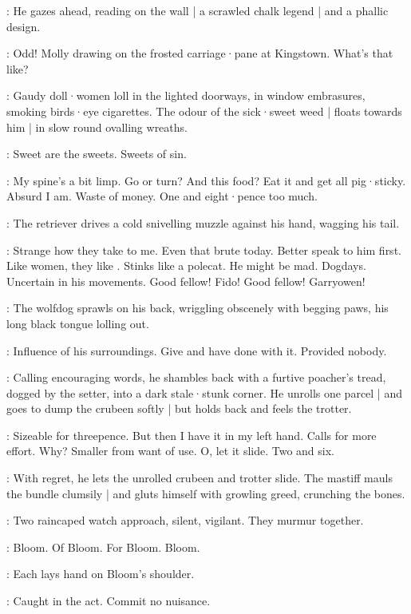 :
He gazes ahead,
reading on the wall |
a scrawled chalk legend  |
and a phallic design.

\Bloom:
%
Odd!
Molly drawing on the frosted carriage·pane at Kingstown.
What's that like?

:
Gaudy doll·women loll in the lighted doorways,
in window embrasures,
smoking birds·eye cigarettes.
The odour of the sick·sweet weed |
floats towards him |
in slow round ovalling wreaths.

\Wreaths:
Sweet are the sweets.
Sweets of sin.

\Bloom:
My spine's a bit limp.
Go or turn?
And this food?
Eat it and get all pig·sticky.
Absurd I am.
Waste of money.
One and eight·pence too much.

:
The retriever drives a cold snivelling muzzle against his hand,
wagging his tail.

\Bloom:
Strange how they take to me.
Even that brute today.
Better speak to him first.
Like women,
they like .
Stinks like a polecat.
He might be mad.
Dogdays.
Uncertain in his movements.
Good fellow!
Fido!
Good fellow!
Garryowen!

:
The wolfdog sprawls on his back,
wriggling obscenely with begging paws,
his long black tongue lolling out.

\Bloom:
Influence of his surroundings.
Give and have done with it.
Provided nobody.

:
Calling encouraging words,
he shambles back with a furtive poacher's tread,
dogged by the setter,
into a dark stale·stunk corner.
He unrolls one parcel |
and goes to dump the crubeen softly |
but holds back and feels the trotter.

\Bloom:
Sizeable for threepence.
But then I have it in my left hand.
Calls for more effort.
Why?
Smaller from want of use.
O,
let it slide.
Two and six.

:
With regret,
he lets the unrolled crubeen and trotter slide.
The mastiff mauls the bundle clumsily |
and gluts himself with growling greed,
crunching the bones.

:
Two raincaped watch approach,
silent,
vigilant.
They murmur together.

\Watch:
Bloom.
Of Bloom.
For Bloom.
Bloom.

:
Each lays hand on Bloom's shoulder.

\FirstWatch[1]:
Caught in the act.
Commit no nuisance.

